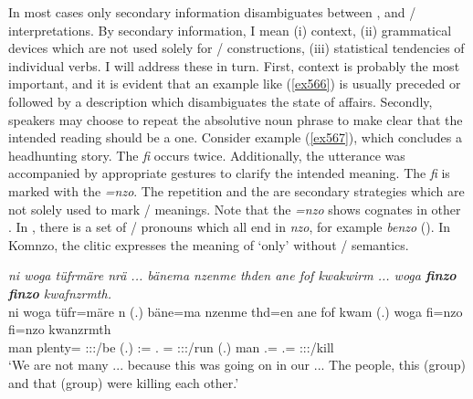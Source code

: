 In most cases only secondary information disambiguates between ,  and / interpretations. By secondary information, I mean (i) context, (ii) grammatical devices which are not used solely for / constructions, (iii) statistical tendencies of individual verbs. I will address these in turn. First, context is probably the most important, and it is evident that an example like (\ref{ex566}) is usually preceded or followed by a description which disambiguates the state of affairs. Secondly, speakers may choose to repeat the absolutive noun phrase to make clear that the intended reading should be a  one. Consider example (\ref{ex567}), which concludes a headhunting story. The  \emph{fi} occurs twice. Additionally, the utterance was accompanied by appropriate gestures to clarify the intended  meaning. The  \emph{fi} is marked with the   \emph{=nzo}. The repetition and the   are secondary strategies which are not solely used to mark / meanings. Note that the   \emph{=nzo} shows cognates in other . In , there is a set of / pronouns which all end in \emph{nzo}, for example \emph{benzo} \Ssg{} (\citealt[1072]{Evans:2015wy}). In Komnzo, the  clitic expresses the meaning of `only' without / semantics.

\begin{exe}
	\ex \emph{ni woga tüfrmäre nrä ... bänema nzenme thden ane fof kwakwirm ... woga \textbf{finzo} \textbf{finzo} kwafnzrmth.}\\
	\gll ni woga tüfr=märe n (.) bäne=ma nzenme thd=en ane fof kwam (.) woga fi=nzo fi=nzo kwanzrmth\\
	{\Fnsg} man plenty={\Priv} \Fpl:\Sbj:\Nonpast:\Ipfv/be (.) \Dem:\Med={\Char} \Fnsg.{\Poss} ={\Loc} {\Dem} {\Emph} \Stsg:\Sbj:\Pst:\Dur/run (.) man \Third.\Abs={\Only} \Third.\Abs={\Only} \Stpl:\Sbj:\Pst:\Dur/kill\\
	\trans `We are not many ... because this was going on in our  ... The people, this (group) and that (group) were killing each other.'
	\label{ex567}
\end{exe}

